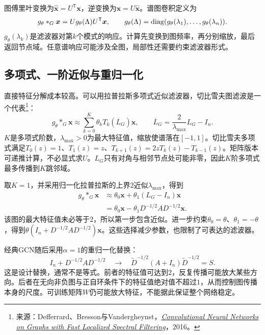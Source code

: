 图傅里叶变换为$\widehat{\bm x}=U^{\mathsf T}\bm x$，逆变换为$\bm x=U\widehat{\bm x}$。谱图卷积定义为
\begin{equation}
 g_\theta *_G\bm x=Ug_\theta(\Lambda)U^{\mathsf T}\bm x,
 \qquad g_\theta(\Lambda)=\operatorname{diag}(g_\theta(\lambda_1),\ldots,g_\theta(\lambda_n)).
 \label{eq:graph-spectral-filter}
\end{equation}
$g_\theta(\lambda_k)$是滤波器对第$k$个模式的响应。计算先变换到图频率，再分别缩放，最后返回节点域。任意谱响应可能涉及全图，局部性还需要约束滤波器形式。

\subsection{多项式、一阶近似与重归一化}
直接特征分解成本较高。可以用拉普拉斯多项式近似滤波器，切比雪夫图滤波是一个代表\footnote{来源：Defferrard、Bresson与Vandergheynst，\href{https://arxiv.org/abs/1606.09375}{\textit{Convolutional Neural Networks on Graphs with Fast Localized Spectral Filtering}}，2016。}：
\begin{equation}
 g_\theta *_G\bm x\approx\sum_{k=0}^K\theta_kT_k(\overline L_G)\bm x,\qquad
 \overline L_G=\frac2{\lambda_{\max}}L_G-I_n.
\end{equation}
$K$是多项式阶数，$\lambda_{\max}>0$为最大特征值，缩放使谱落在$[-1,1]$。切比雪夫多项式满足$T_0(z)=1$、$T_1(z)=z$、$T_{k+1}(z)=2zT_k(z)-T_{k-1}(z)$。矩阵版本可递推计算，不必显式求$U$。$L_G$只有对角与相邻节点处可能非零，因此$K$阶多项式最多传播到$K$跳邻域。

取$K=1$，并采用归一化拉普拉斯的上界$2$近似$\lambda_{\max}$，得到
\begin{align}
 g_\theta *_G\bm x
 &\approx\theta_0\bm x+\theta_1(L_G-I_n)\bm x\\
 &=\theta_0\bm x-\theta_1D^{-1/2}AD^{-1/2}\bm x.
\end{align}
该图的最大特征值未必等于$2$，所以第一步包含近似。进一步约束$\theta_0=\theta$、$\theta_1=-\theta$，得到$\theta(I_n+D^{-1/2}AD^{-1/2})\bm x$。这些选择减少参数，也限制了可表达的滤波器。

经典GCN随后采用$\alpha=1$的重归一化替换：
\begin{equation}
 I_n+D^{-1/2}AD^{-1/2}\quad\longrightarrow\quad
 \widetilde D^{-1/2}(A+I_n)\widetilde D^{-1/2}=S.
\end{equation}
这是设计替换，通常不是等式。前者的特征值可达到$2$，反复传播可能放大某些方向。后者在无向非负图与正自环条件下的特征值绝对值不超过$1$，从而控制图传播本身的尺度。可训练矩阵$W$仍可能放大特征，不能据此保证整个网络稳定。

